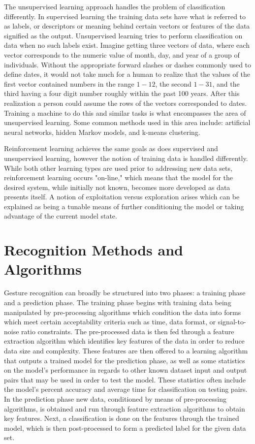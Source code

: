 \documentclass[conference]{IEEEtran}
\begin{document}
The unsupervised learning approach handles the problem of classification differently. In supervised learning the training data sets have what is referred to as labels, or descriptors or meaning behind certain vectors or features of the data signified as the output. Unsupervised learning tries to perform classification on data when no such labels exist. Imagine getting three vectors of data, where each vector corresponds to the numeric value of month, day, and year of a group of individuals. Without the appropriate forward slashes or dashes commonly used to define dates, it would not take much for a human to realize that the values of the first vector contained numbers in the range $1-12$, the second $1-31$, and the third having a four digit number roughly within the past 100 years. After this realization a person could assume the rows of the vectors corresponded to dates. Training a machine to do this and similar tasks is what encompasses the area of unsupervised learning. Some common methods used in this area include: artificial neural networks, hidden Markov models, and k-means clustering.

Reinforcement learning achieves the same goals as does supervised and unsupervised learning, however the notion of training data is handled differently. While both other learning types are used prior to addressing new data sets, reinforcement learning occurs "on-line," which means that the model for the desired system, while initially not known, becomes more developed as data presents itself. A notion of exploitation versus exploration arises which can be explained as being a tunable means of further conditioning the model or taking advantage of the current model state.


\section{Recognition Methods and Algorithms}

Gesture recognition can broadly be structured into two phases: a training phase and a prediction phase. The training phase begins with training data being manipulated by pre-processing algorithms which condition the data into forms which meet certain acceptability criteria such as time, data format, or signal-to-noise ratio constraints. The pre-processed data is then fed through a feature extraction algorithm which identifies key features of the data in order to reduce data size and complexity. These features are then offered to a learning algorithm that outputs a trained model for the prediction phase, as well as some statistics on the model's performance in regards to other known dataset input and output pairs that may be used in order to test the model. These statistics often include the model's percent accuracy and average time for classification on testing pairs. In the prediction phase new data, conditioned by means of pre-processing algorithms, is obtained and run through feature extraction algorithms to obtain key features. Next, a classification is done on the features through the trained model, which is then post-processed to form a predicted label for the given data set.
\end{document}
